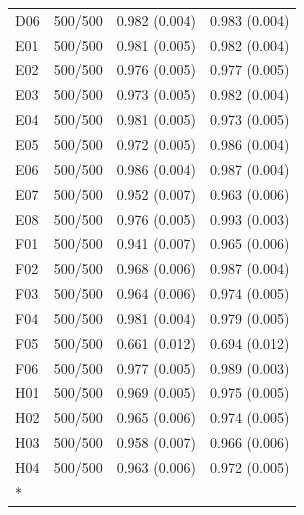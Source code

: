 \begin{longtable}[t]{llll}
D06 & 500/500 & 0.982 (0.004) & 0.983 (0.004)\\
E01 & 500/500 & 0.981 (0.005) & 0.982 (0.004)\\
E02 & 500/500 & 0.976 (0.005) & 0.977 (0.005)\\
E03 & 500/500 & 0.973 (0.005) & 0.982 (0.004)\\
E04 & 500/500 & 0.981 (0.005) & 0.973 (0.005)\\
E05 & 500/500 & 0.972 (0.005) & 0.986 (0.004)\\
E06 & 500/500 & 0.986 (0.004) & 0.987 (0.004)\\
E07 & 500/500 & 0.952 (0.007) & 0.963 (0.006)\\
E08 & 500/500 & 0.976 (0.005) & 0.993 (0.003)\\
F01 & 500/500 & 0.941 (0.007) & 0.965 (0.006)\\
F02 & 500/500 & 0.968 (0.006) & 0.987 (0.004)\\
F03 & 500/500 & 0.964 (0.006) & 0.974 (0.005)\\
F04 & 500/500 & 0.981 (0.004) & 0.979 (0.005)\\
F05 & 500/500 & 0.661 (0.012) & 0.694 (0.012)\\
F06 & 500/500 & 0.977 (0.005) & 0.989 (0.003)\\
H01 & 500/500 & 0.969 (0.005) & 0.975 (0.005)\\
H02 & 500/500 & 0.965 (0.006) & 0.974 (0.005)\\
H03 & 500/500 & 0.958 (0.007) & 0.966 (0.006)\\
H04 & 500/500 & 0.963 (0.006) & 0.972 (0.005)\\*
\end{longtable}
